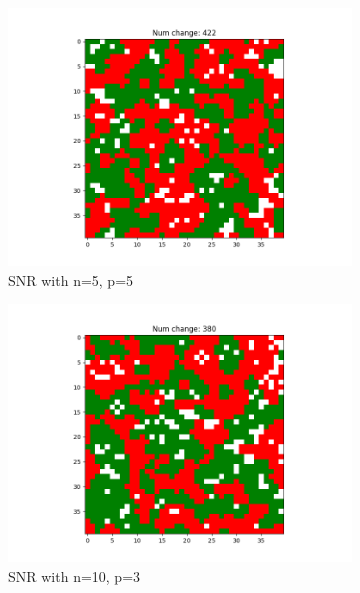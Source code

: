 \documentclass[11pt]{article}
\begin{document}
\begin{figure}[h]
\begin{subfigure}{0.14\textwidth}
			\includegraphics[width=\linewidth]{final_social_n5p5.png}
			\caption{\centering SNR with n=5, p=5}
		\end{subfigure}\hfill
		\begin{subfigure}{0.14\textwidth}
			\includegraphics[width=\linewidth]{final_social_n10p3.png}
			\caption{\centering SNR with n=10, p=3}
		\end{subfigure}\hfill
		\begin{subfigure}{0.14\textwidth}

\end{subfigure}
\end{figure}
\end{document}
